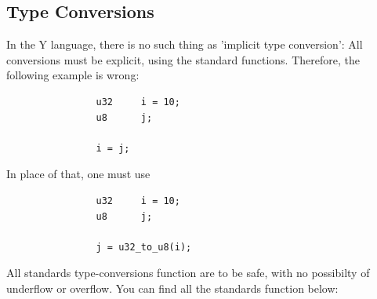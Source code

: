 \documentclass{scrartcl}
\begin{document}
        \subsection{Type Conversions} \label{Type_conv}
            In the Y language, there is no such thing as 'implicit type conversion':
            All conversions must be explicit, using the standard functions.
            Therefore, the following example is wrong:
            \begin{lstlisting}
                u32     i = 10;
                u8      j;

                i = j;
            \end{lstlisting}
            In place of that, one must use
            \begin{lstlisting}
                u32     i = 10;
                u8      j;

                j = u32_to_u8(i);
            \end{lstlisting}
            All standards type-conversions function are to be safe, with no
            possibilty of underflow or overflow. You can find all the standards
            function below:
\\\\
\hspace*{-60px}
\end{document}
